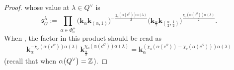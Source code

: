 \documentclass[pdftex]{sigma}
\numberwithin{equation}{section}
\begin{document}
\begin{proof}
whose value at $\lambda\in Q^\vee$ is
\[
\mathfrak{s}^\lambda_\mathcal{O}:=\prod_{\alpha\in\Phi_0^+}\bigl(\mathbf{k}_{\alpha}\mathbf{k}_{(\alpha,1)}\bigr)^{-\frac{\chi_e(\alpha(c^\mathcal{O}))\alpha(\lambda)}{2}}
\bigl(\mathbf{k}_{\frac{\alpha}{2}}\mathbf{k}_{(\frac{\alpha}{2},\frac{1}{2})}\bigr)^{\frac{\chi_o(\alpha(c^\mathcal{O}))\alpha(\lambda)}{2}}.
\]
When , the factor in this product should be read as
\[
\mathbf{k}_\alpha^{-\chi_e(\alpha(c^\mathcal{O}))\alpha(\lambda)}\,\mathbf{k}_{\frac{\alpha}{2}}^{\chi_o(\alpha(c^\mathcal{O}))\alpha(\lambda)}=
\mathbf{k}_{\alpha}^{(\chi_o(\alpha(c^\mathcal{O}))-\chi_e(\alpha(c^\mathcal{O})))\alpha(\lambda)}
\]
\big(recall that  when $\alpha\smash{\bigl(Q^\vee\bigr)}=\mathbb{Z}$\big).


\end{proof}
\end{document}
